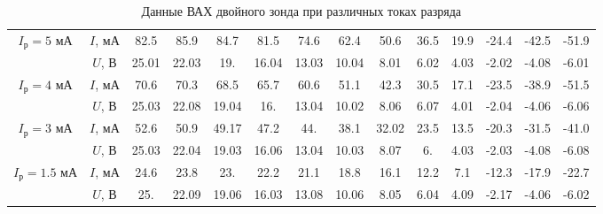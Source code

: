 \begin{table}[h!]
    \centering
    \begin{tabular}{|c|c|c|c|c|c|c|c|c|c|c|c|c|c|}
        \hline
        \multirow{2}{*}{$I_{\text{р}} = 5$ мА} & $I$, мА & 82.5&85.9&84.7&81.5&74.6&62.4&50.6&36.5&19.9&-24.4&-42.5&-51.9\\
        &$U$, В & 25.01&  22.03&  19.  &  16.04&  13.03&  10.04&   8.01&   6.02& 4.03&  -2.02&  -4.08&  -6.01\\\hline
        \multirow{2}{*}{$I_{\text{р}} = 4$ мА} & $I$, мА & 70.6&  70.3&  68.5&  65.7&  60.6&  51.1&  42.3&  30.5&  17.1&
       -23.5& -38.9& -51.5\\
       &$U$, В & 25.03& 22.08& 19.04& 16.  & 13.04& 10.02&  8.06&  6.07&  4.01&
       -2.04& -4.06& -6.06\\\hline
       \multirow{2}{*}{$I_{\text{р}} = 3$ мА} & $I$, мА & 52.6 &  50.9 &  49.17&  47.2 &  44.  &  38.1 &  32.02&  23.5 &
        13.5 & -20.3 & -31.5 & -41.0\\
       &$U$, В & 25.03& 22.04& 19.03& 16.06& 13.04& 10.03&  8.07&  6.  &  4.03&
       -2.03& -4.08& -6.08\\\hline
       \multirow{2}{*}{$I_{\text{р}} = 1.5$ мА} & $I$, мА & 24.6&  23.8&  23. &  22.2&  21.1&  18.8&  16.1&  12.2&   7.1&
       -12.3& -17.9& -22.7\\
       &$U$, В & 25.  & 22.09& 19.06& 16.03& 13.08& 10.06&  8.05&  6.04&  4.09&
       -2.17& -4.06& -6.02\\\hline
    \end{tabular}
    \caption{Данные ВАХ двойного зонда при различных токах разряда}
\end{table}

